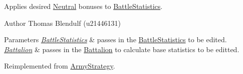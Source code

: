 Applies desired \mbox{\hyperlink{class_neutral}{Neutral}} bonuses to \mbox{\hyperlink{class_battle_statistics}{Battle\+Statistics}}. 

\begin{DoxyAuthor}{Author}
Thomas Blendulf (u21446131) 
\end{DoxyAuthor}

\begin{DoxyParams}{Parameters}
{\em \mbox{\hyperlink{class_battle_statistics}{Battle\+Statistics}}} & passes in the \mbox{\hyperlink{class_battle_statistics}{Battle\+Statistics}} to be edited. \\
\hline
{\em \mbox{\hyperlink{class_battalion}{Battalion}}} & passes in the \mbox{\hyperlink{class_battalion}{Battalion}} to calculate base statistics to be editted. \\
\hline
\end{DoxyParams}


Reimplemented from \mbox{\hyperlink{class_army_strategy_ade28f2b5107c9fcdc58e73e1053e6cff}{Army\+Strategy}}.

